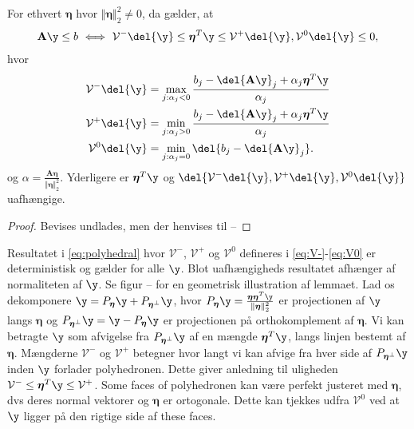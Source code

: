 \begin{lem} \label{lem:polyhedral}
For ethvert \(\boldsymbol{\eta}\) hvor \(\Vert  \boldsymbol{\eta} \Vert_2^2 \neq 0\), da gælder, at
\begin{align}
\mathbf{A} \y \leq b \ \Longleftrightarrow \ \mathcal{V}^- \del{\y} \leq \boldsymbol{\eta}^T \y \leq \mathcal{V}^+ \del{\y}, \mathcal{V}^0 \del{\y} \leq 0, \label{eq:polyhedral}
\end{align}
hvor
\begin{align}
\mathcal{V}^- \del{\y} &= \max_{j: \alpha_j <0} \frac{b_j - \del{\mathbf{A} \y}_j + \alpha_j \boldsymbol{\eta}^T \y}{\alpha_j} \label{eq:V-} \\
\mathcal{V}^+ \del{\y} &= \min_{j: \alpha_j >0} \frac{b_j - \del{\mathbf{A} \y}_j + \alpha_j \boldsymbol{\eta}^T \y}{\alpha_j} \label{eq:V+} \\
\mathcal{V}^0 \del{\y} &= \min_{j: \alpha_j =0} \del{b_j - \del{\mathbf{A} \y}_j}.  \label{eq:V0} 
\end{align}
og \(\alpha=\frac{\mathbf{A} \boldsymbol{\eta}}{\Vert  \boldsymbol{\eta} \Vert_2^2}\).
Yderligere  er \(\boldsymbol{\eta}^T \y\) og \(\del{\mathcal{V}^-\del{\y}, \mathcal{V}^+\del{\y},\mathcal{V}^0\del{\y}}\) uafhængige. 
\end{lem}
\begin{proof}
Bevises undlades, men der henvises til --
\end{proof}
Resultatet i \eqref{eq:polyhedral} hvor \(\mathcal{V}^-\), \(\mathcal{V}^+\) og \(\mathcal{V}^0\) defineres i \eqref{eq:V-}-\eqref{eq:V0} er deterministisk og gælder for alle \(\y\).
Blot uafhængigheds resultatet afhænger af normaliteten af \(\y\).
Se figur -- for en geometrisk illustration af lemmaet.
Lad os dekomponere \(\y=P_{\boldsymbol{\eta}} \y + P_{\boldsymbol{\eta}^\perp} \y\), hvor \(P_{\boldsymbol{\eta}} \y = \frac{\boldsymbol{\eta} \boldsymbol{\eta}^T \y}{\Vert \boldsymbol{\eta} \Vert_2^2}\) er projectionen af \(\y\) langs \(\boldsymbol{\eta}\) og  \(P_{\boldsymbol{\eta}^\perp} \y = \y - P_{\boldsymbol{\eta}} \y\) er projectionen på orthokomplement af \(\boldsymbol{\eta}\).
Vi kan betragte \(\y\) som afvigelse fra \(P_{\boldsymbol{\eta}^\perp} \y\) af en mængde \(\boldsymbol{\eta}^T \y\), langs linjen bestemt af \(\boldsymbol{\eta}\).
Mængderne \(\mathcal{V}^-\) og \(\mathcal{V}^+\) betegner hvor langt vi kan afvige fra hver side af \(P_{\boldsymbol{\eta}^\perp} \y\) inden \(\y\) forlader polyhedronen.
Dette giver anledning til uligheden \(\mathcal{V}^- \leq \boldsymbol{\eta}^T \y \leq \mathcal{V}^+\).
Some faces of polyhedronen kan være perfekt justeret med \(\boldsymbol{\eta}\), dvs deres normal vektorer og \(\boldsymbol{\eta}\) er ortogonale.
Dette kan tjekkes udfra \(\mathcal{V}^0\) ved at \(\y\) ligger på den rigtige side af these faces.  


